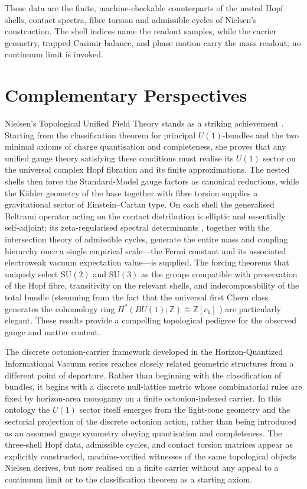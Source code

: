 \documentclass[11pt]{amsart}
\begin{document}
These data are the finite, machine-checkable counterparts of the nested Hopf shells, contact spectra, fibre torsion and admissible cycles of Nielsen's construction. The shell indices name the readout samples, while the carrier geometry, trapped Casimir balance, and phase motion carry the mass readout; no continuum limit is invoked.

\section{Complementary Perspectives}

Nielsen's Topological Unified Field Theory stands as a striking achievement \cite{NielsenTUFT2026}. Starting from the classification theorem for principal $U(1)$-bundles \cite{Milnor1956,Husemoller1994} and the two minimal axioms of charge quantisation and completeness, she proves that any unified gauge theory satisfying these conditions must realise its $U(1)$ sector on the universal complex Hopf fibration and its finite approximations. The nested shells then force the Standard-Model gauge factors as canonical reductions, while the Kähler geometry of the base together with fibre torsion supplies a gravitational sector of Einstein--Cartan type. On each shell the generalised Beltrami operator acting on the contact distribution is elliptic and essentially self-adjoint; its zeta-regularised spectral determinants \cite{RaySinger1971,Cheeger1979,Muller1978}, together with the intersection theory of admissible cycles, generate the entire mass and coupling hierarchy once a single empirical scale---the Fermi constant and its associated electroweak vacuum expectation value---is supplied. The forcing theorems that uniquely select $\mathrm{SU}(2)$ and $\mathrm{SU}(3)$ as the groups compatible with preservation of the Hopf fibre, transitivity on the relevant shells, and indecomposability of the total bundle (stemming from the fact that the universal first Chern class generates the cohomology ring $H^*(BU(1);\mathbb{Z})\cong\mathbb{Z}[c_1]$ \cite{MilnorStasheff1974}) are particularly elegant. These results provide a compelling topological pedigree for the observed gauge and matter content.

The discrete octonion-carrier framework developed in the Horizon-Quantized Informational Vacuum series \cite{ettinger2026hqiv,hqiv-lightcone-paper,hqiv-so8-paper,hqiv-3d-growth-paper,hqiv-oct-action-paper,hqiv-kirchhoff-paper} reaches closely related geometric structures from a different point of departure. Rather than beginning with the classification of bundles, it begins with a discrete null-lattice metric whose combinatorial rules are fixed by horizon-area monogamy on a finite octonion-indexed carrier. In this ontology the $U(1)$ sector itself emerges from the light-cone geometry and the sectorial projection of the discrete octonion action, rather than being introduced as an assumed gauge symmetry obeying quantisation and completeness. The three-shell Hopf data, admissible cycles, and contact torsion matrices appear as explicitly constructed, machine-verified witnesses of the same topological objects Nielsen derives, but now realised on a finite carrier without any appeal to a continuum limit or to the classification theorem as a starting axiom.
\end{document}
